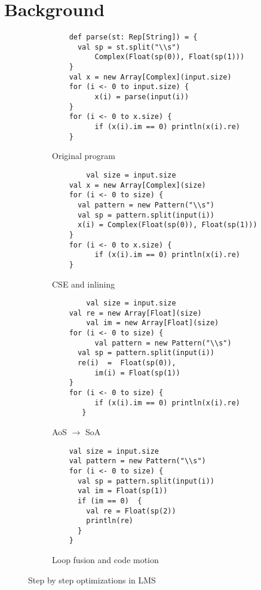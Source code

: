 \section{Background}
\label{sec:background}
\begin{figure*}
  \begin{subfigure}[b]{.5\linewidth}
    \begin{lstlisting}
  	def parse(st: Rep[String]) = {               
	  val sp = st.split("\\s")
          Complex(Float(sp(0)), Float(sp(1)))
	}
	val x = new Array[Complex](input.size)
	for (i <- 0 to input.size) {
     	  x(i) = parse(input(i)) 
	}
	for (i <- 0 to x.size) {
    	  if (x(i).im == 0) println(x(i).re) 
	}
    \end{lstlisting}
    \caption{Original program}
    \label{lst:original}
  \end{subfigure}
  \begin{subfigure}[b]{.5\linewidth}
    \begin{lstlisting}
        val size = input.size
	val x = new Array[Complex](size)
	for (i <- 0 to size) {
   	  val pattern = new Pattern("\\s") 
	  val sp = pattern.split(input(i))
	  x(i) = Complex(Float(sp(0)), Float(sp(1))) 
	}
	for (i <- 0 to x.size) {
          if (x(i).im == 0) println(x(i).re) 
	}
    \end{lstlisting}
    \caption{CSE and inlining} 
    \label{lst:cse-inline}
  \end{subfigure}
  \begin{subfigure}[b]{.5\linewidth}
    \begin{lstlisting}
        val size = input.size
	val re = new Array[Float](size)
        val im = new Array[Float](size)
	for (i <- 0 to size) {
          val pattern = new Pattern("\\s") 
   	  val sp = pattern.split(input(i))
	  re(i)  =  Float(sp(0)),
          im(i) = Float(sp(1)) 
	}
	for (i <- 0 to size) {
          if (x(i).im == 0) println(x(i).re) 
       }
    \end{lstlisting}
    \caption{AoS $\rightarrow$ SoA}
    \label{lst:aos-soa}
  \end{subfigure}
\begin{subfigure}[b]{.5\linewidth}
    \begin{lstlisting}
	val size = input.size
	val pattern = new Pattern("\\s") 
	for (i <- 0 to size) {
	  val sp = pattern.split(input(i))
 	  val im = Float(sp(1))
	  if (im == 0)  {
	    val re = Float(sp(2))
 	    println(re)
   	  }
	}
    \end{lstlisting}
    \caption{Loop fusion and code motion}
    \label{lst:fusion-motion}
  \end{subfigure}
  \caption{Step by step optimizations in LMS}
  \label{lst:step-by-step-lms}
\end{figure*}

